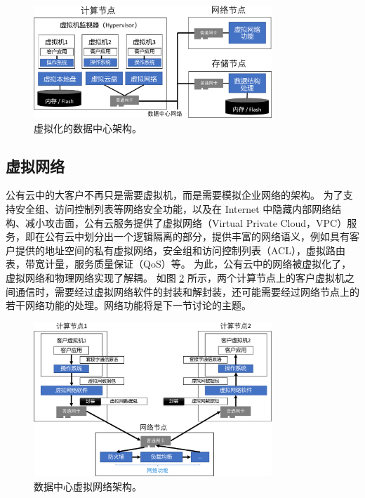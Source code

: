\begin{figure}[htbp]
	\centering
	\includegraphics[width=0.8\textwidth]{figures/virt_arch.pdf}
	\caption{虚拟化的数据中心架构。}
	\label{background:fig:virt-architecture}
\end{figure}


\subsection{虚拟网络}


公有云中的大客户不再只是需要虚拟机，而是需要模拟企业网络的架构。
为了支持安全组、访问控制列表等网络安全功能，以及在 Internet 中隐藏内部网络结构、减小攻击面，公有云服务提供了虚拟网络（Virtual Private Cloud，VPC）服务，即在公有云中划分出一个逻辑隔离的部分，提供丰富的网络语义，例如具有客户提供的地址空间的私有虚拟网络，安全组和访问控制列表（ACL），虚拟路由表，带宽计量，服务质量保证（QoS）等。 
为此，公有云中的网络被虚拟化了，虚拟网络和物理网络实现了解耦。
如图 \ref{background:fig:network-architecture} 所示，两个计算节点上的客户虚拟机之间通信时，需要经过虚拟网络软件的封装和解封装，还可能需要经过网络节点上的若干网络功能的处理。网络功能将是下一节讨论的主题。

\begin{figure}[htbp]
	\centering
	\includegraphics[width=0.8\textwidth]{figures/VPC_arch.pdf}
	\caption{数据中心虚拟网络架构。}
	\label{background:fig:network-architecture}
\end{figure}



